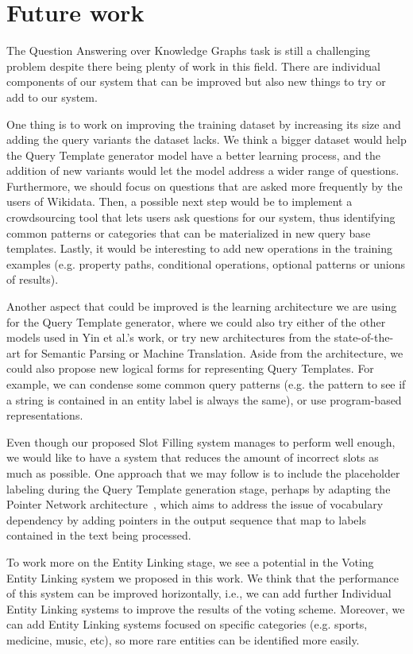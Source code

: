 \section{Future work}
\label{cap6:conclusions/futureWork}
The Question Answering over Knowledge Graphs task is still a challenging problem despite there being 
plenty of work in this field. There are individual components of our system that can be improved but 
also new things to try or add to our system.

One thing is to work on improving the training dataset by increasing its size and adding the \SPARQL{} 
query variants the \LCQuADtwo{} dataset lacks. We think a bigger dataset would help the Query Template 
generator model have a better learning process, and the addition of new variants would let the model 
address a wider range of questions. Furthermore, we should focus on questions that are asked more 
frequently by the users of Wikidata. Then, a possible next step would be to implement a crowdsourcing 
tool that lets users ask questions for our system, thus identifying common patterns or categories 
that can be materialized in new query base templates. Lastly, it would be interesting to add new 
operations in the training examples (e.g. property paths, conditional operations, optional patterns 
or unions of results).

Another aspect that could be improved is the learning architecture we are using for the Query 
Template generator, where we could also try either of the other models used in Yin et al.'s work, or 
try new architectures from the state-of-the-art for Semantic Parsing or Machine Translation. Aside 
from the architecture, we could also propose new logical forms for representing Query Templates. For 
example, we can condense some common query patterns (e.g. the pattern to see if a string is contained 
in an entity label is always the same), or use program-based representations. 

Even though our proposed Slot Filling system manages to perform well enough, we would like to have a 
system that reduces the amount of incorrect slots as much as possible. One approach that we may 
follow is to include the placeholder labeling during the Query Template generation stage, perhaps by 
adapting the Pointer Network architecture~\cite{key:vinyals2015pointer}, which 
aims to address the issue of vocabulary dependency by adding pointers in the output sequence that 
map to labels contained in the text being processed.

To work more on the Entity Linking stage, we see a potential in the Voting Entity Linking system we 
proposed in this work. We think that the performance of this system can be improved horizontally, 
i.e., we can add further Individual Entity Linking systems to improve the results of the voting scheme. 
Moreover, we can add Entity Linking systems focused on specific categories (e.g. sports, medicine, 
music, etc), so more rare entities can be identified more easily.

